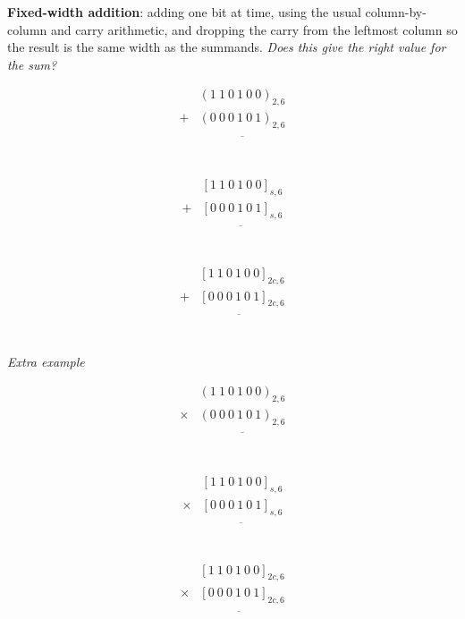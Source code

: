 \documentclass[12pt, oneside]{article}
\begin{document}
\vfill
\newpage
{\bf Fixed-width addition}: adding one bit at time, using the usual column-by-column and carry arithmetic, and dropping the carry from the leftmost column so the result is the same width as the summands.  {\it Does this give the right value for the sum?}
\begin{multicols}{3}
\begin{align*}
   & (1~ 1~ 0~ 1~ 0~ 0)_{2,6}\\
+ & (0~ 0~ 0~ 1~ 0~ 1)_{2,6}\\
&\overline{\phantom{(1~1~1~0~0~1)_{2,6}}}\\
\end{align*}

\begin{align*}
   & [1~ 1~ 0~ 1~ 0~ 0]_{s,6}\\
+ & [0~ 0~ 0~ 1~ 0~ 1]_{s,6}\\
&\overline{\phantom{(1~1~1~0~0~1)_2}}\\
\end{align*}

\begin{align*}
   & [1~ 1~ 0~ 1~ 0~ 0]_{2c,6}\\
+ & [0~ 0~ 0~ 1~ 0~ 1]_{2c,6}\\
&\overline{\phantom{(1~1~1~0~0~1)_2}}\\
\end{align*}
\end{multicols}

\vfill
{\it Extra example}

\vspace{-25pt}

\begin{multicols}{3}
\begin{align*}
   & (1~ 1~ 0~ 1~ 0~ 0)_{2,6}\\
\times & (0~ 0~ 0~ 1~ 0~ 1)_{2,6}\\
&\overline{\phantom{(1~1~1~0~0~1)_{2,6}}}\\
\end{align*}

\begin{align*}
   & [1~ 1~ 0~ 1~ 0~ 0]_{s,6}\\
\times & [0~ 0~ 0~ 1~ 0~ 1]_{s,6}\\
&\overline{\phantom{(1~1~1~0~0~1)_2}}\\
\end{align*}

\begin{align*}
   & [1~ 1~ 0~ 1~ 0~ 0]_{2c,6}\\
\times & [0~ 0~ 0~ 1~ 0~ 1]_{2c,6}\\
&\overline{\phantom{(1~1~1~0~0~1)_2}}\\
\end{align*}
\end{multicols}
\end{document}
